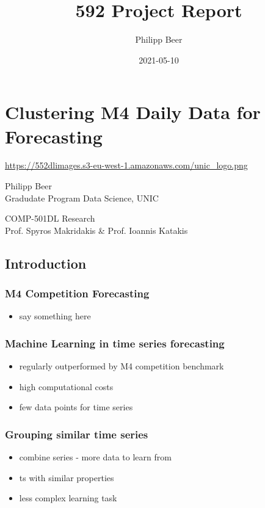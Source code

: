 \documentclass[11pt]{article}
\author{Philipp Beer}
\date{2021-05-10}
\title{592 Project Report}
\begin{document}
\maketitle


\section*{Clustering M4 Daily Data for Forecasting}
\label{sec:orgd3b6979}
\url{https://552dlimages.s3-eu-west-1.amazonaws.com/unic\_logo.png}

Philipp Beer\\
Gradudate Program Data Science, UNIC

COMP-501DL Research\\
Prof. Spyros Makridakis \& Prof. Ioannis Katakis\\
\subsection*{Introduction}
\label{sec:org088bb96}
\subsubsection*{M4 Competition Forecasting}
\label{sec:orgdcd1239}
\begin{itemize}
\item say something here
\end{itemize}

\subsubsection*{Machine Learning in time series forecasting}
\label{sec:orgbf9174a}
\begin{itemize}
\item regularly outperformed by M4 competition benchmark
\item high computational costs
\item few data points for time series
\end{itemize}
\subsubsection*{Grouping similar time series}
\label{sec:org90849ae}
\begin{itemize}
\item combine series - more data to learn from
\item ts with similar properties
\item less complex learning task
\end{itemize}
\end{document}
